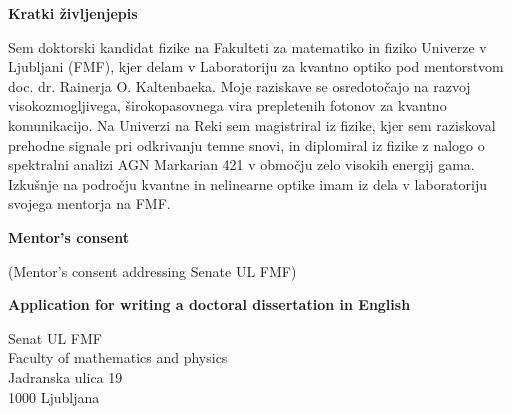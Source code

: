 \documentclass{article}
\theoremstyle{mytheoremstyle}
\theoremstyle{mytheoremstyle}
\theoremstyle{myproblemstyle}
\begin{document}
\vspace{1cm}

\begin{center}
	\textbf{Kratki življenjepis}
\end{center}
Sem doktorski kandidat fizike na Fakulteti za matematiko in fiziko Univerze v Ljubljani (FMF),
kjer delam v Laboratoriju za kvantno optiko pod mentorstvom doc. dr. Rainerja O. Kaltenbaeka.
Moje raziskave se osredotočajo na razvoj visokozmogljivega, širokopasovnega vira prepletenih fotonov za kvantno komunikacijo.
Na Univerzi na Reki sem magistriral iz fizike, kjer sem raziskoval prehodne signale pri odkrivanju temne snovi,
in diplomiral iz fizike z nalogo o spektralni analizi AGN Markarian 421 v območju zelo visokih energij gama.
Izkušnje na področju kvantne in nelinearne optike imam iz dela v laboratoriju svojega mentorja na FMF.



\clearpage
\pagestyle{plain}

\vspace{1cm}

\begin{center}
	\textbf{Mentor's consent}
\end{center}

\vspace{1cm}

\noindent (Mentor's consent addressing Senate UL FMF)


\clearpage
\pagestyle{plain}

\begin{center}
	\textbf{Application for writing a doctoral dissertation in English}\\
\end{center}

\noindent Senat UL FMF\\
Faculty of mathematics and physics\\
Jadranska ulica 19\\
1000 Ljubljana\\
\end{document}
